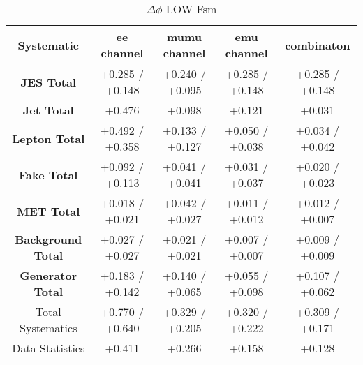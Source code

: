  
\begin{table}[htbp]
\scriptsize
  \begin{center} 
  \begin{tabular}{|c|c|c|c|c|}
  \hline
   Systematic                            &  ee channel&  mumu channel&  emu channel&  combinaton\\
 \hline
\textbf{JES Total}                    &+0.285   / +0.148   & +0.240   / +0.095   & +0.285   / +0.148   & +0.285   / +0.148  \\
\textbf{Jet Total}                    &+0.476              & +0.098              & +0.121              & +0.031             \\
\textbf{Lepton Total}                 &+0.492   / +0.358   & +0.133   / +0.127   & +0.050   / +0.038   & +0.034   / +0.042  \\
\textbf{Fake Total}                   &+0.092   / +0.113   & +0.041   / +0.041   & +0.031   / +0.037   & +0.020   / +0.023  \\
\textbf{MET Total}                    &+0.018   / +0.021   & +0.042   / +0.027   & +0.011   / +0.012   & +0.012   / +0.007  \\
\textbf{Background Total}             &+0.027   / +0.027   & +0.021   / +0.021   & +0.007   / +0.007   & +0.009   / +0.009  \\
\textbf{Generator Total}              &+0.183   / +0.142   & +0.140   / +0.065   & +0.055   / +0.098   & +0.107   / +0.062  \\
  \hline
  \hline
Total Systematics                     &+0.770   / +0.640   & +0.329   / +0.205   & +0.320   / +0.222   & +0.309   / +0.171  \\
Data Statistics                       &+0.411              & +0.266              & +0.158              & +0.128             \\
  \hline
  \end{tabular}
  \end{center} 
  \label{tab:fsm_nominal_deltaPhi_low}
  \caption{$\Delta\phi$ LOW Fsm}
\end{table}


